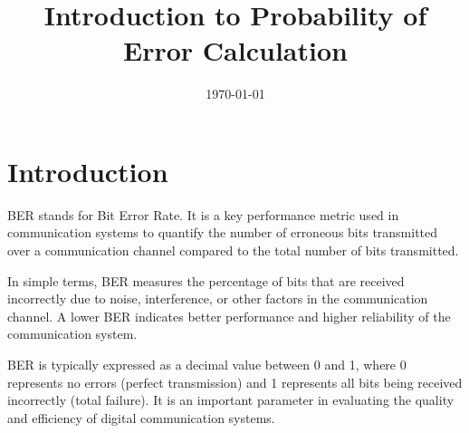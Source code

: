 \documentclass{article}
\begin{document}
	
	\title{Introduction to Probability of Error Calculation}
	\author{}
	\date{\today}
	\maketitle
	
	\section{Introduction}
	BER stands for Bit Error Rate. It is a key performance metric used in communication systems to quantify the number of erroneous bits transmitted over a communication channel compared to the total number of bits transmitted. 
	
	In simple terms, BER measures the percentage of bits that are received incorrectly due to noise, interference, or other factors in the communication channel. A lower BER indicates better performance and higher reliability of the communication system.
	
	BER is typically expressed as a decimal value between 0 and 1, where 0 represents no errors (perfect transmission) and 1 represents all bits being received incorrectly (total failure). It is an important parameter in evaluating the quality and efficiency of digital communication systems.
	

	
\end{document}
